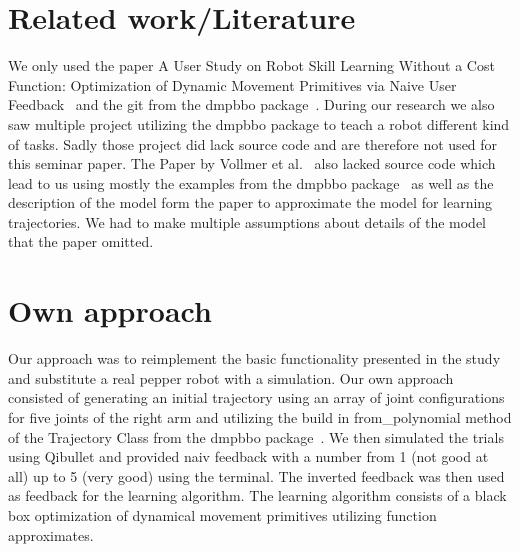 \documentclass{article}
\begin{document}
    \section{Related work/Literature}

    We only used the paper A User Study on Robot Skill Learning Without a Cost Function: Optimization of Dynamic
    Movement Primitives via Naive User Feedback~\cite{vollmer2018} and the git from the dmpbbo package~\cite{stulp2019dmpbbo}.
    During our research we also saw multiple project utilizing the dmpbbo package to teach a robot different kind of tasks.
    Sadly those project did lack source code and are therefore not used for this seminar paper.
    The Paper by Vollmer et al.~\cite{vollmer2018} also lacked source code which lead to us using mostly the examples
    from the dmpbbo package~\cite{stulp2019dmpbbo} as well as the description of the model form the paper to
    approximate the model for learning trajectories.
    We had to make multiple assumptions about details of the model that the paper omitted.


    \section{Own approach}
    Our approach was to reimplement the basic functionality presented in the study and substitute a real pepper robot with a
    simulation.
    Our own approach consisted of generating an initial trajectory using an array of joint configurations for five joints of
    the right arm and utilizing the build in from\_polynomial method of the Trajectory Class from the dmpbbo
    package~\cite{stulp2019dmpbbo}.
    We then simulated the trials using Qibullet \cite{QiBullet} and provided naiv feedback with a number from 1 (not good at
    all) up to 5 (very good) using the terminal.
    The inverted feedback was then used as feedback for the learning algorithm.
    The learning algorithm consists of a black box optimization of dynamical movement primitives utilizing function approximates.
\end{document}
